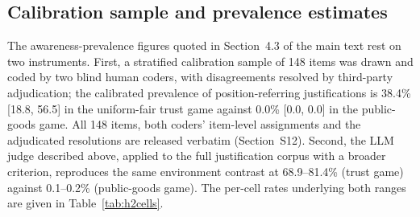 \documentclass[11pt,a4paper]{article}
\begin{document}
\subsection{Calibration sample and prevalence estimates}

The awareness-prevalence figures quoted in Section~4.3 of the main
text rest on two instruments. First, a stratified calibration sample
of 148 items was drawn and coded by two blind human coders, with
disagreements resolved by third-party adjudication; the calibrated
prevalence of position-referring justifications is 38.4\%
[18.8, 56.5] in the uniform-fair trust game against 0.0\% [0.0, 0.0]
in the public-goods game. All 148 items, both coders' item-level
assignments and the adjudicated resolutions are released verbatim
(Section~S12). Second, the LLM judge described above, applied to the
full justification corpus with a broader criterion, reproduces the
same environment contrast at 68.9--81.4\% (trust game) against
0.1--0.2\% (public-goods game).
The per-cell rates underlying both ranges are given in
Table~\ref{tab:h2cells}.
\end{document}
